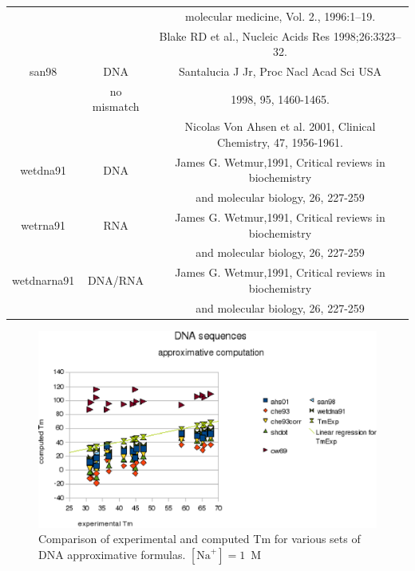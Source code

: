 \documentclass{article}
\begin{document}
\begin{table}[h]
\begin{tabular}[h]{| c | c | c |}
 & & molecular medicine, Vol. 2., 1996:1–19. \\
 & & Blake RD et al., Nucleic Acids Res 1998;26:3323–32. \\
san98 & DNA & Santalucia J Jr, Proc Nacl Acad Sci USA \\
 & no mismatch & 1998, 95, 1460-1465. \\
 & & Nicolas Von Ahsen et al. 2001, Clinical Chemistry, 47, 1956-1961. \\
wetdna91 & DNA & James G. Wetmur,1991, Critical reviews in biochemistry \\
 & & and molecular biology, 26, 227-259 \\
wetrna91 & RNA & James G. Wetmur,1991, Critical reviews in biochemistry \\
 & & and molecular biology, 26, 227-259 \\
wetdnarna91 & DNA/RNA & James G. Wetmur,1991, Critical reviews in biochemistry \\
 & & and molecular biology, 26, 227-259 \\
\end{tabular}
\end{table}
 
\begin{figure}[h]
\includegraphics{images/DNAApproximativeMode.eps}
\caption{Comparison of experimental and computed Tm for various sets of
 DNA approximative formulas. $[\mbox{Na}^+] = 1$~M}
\end{figure}   
\end{document}
